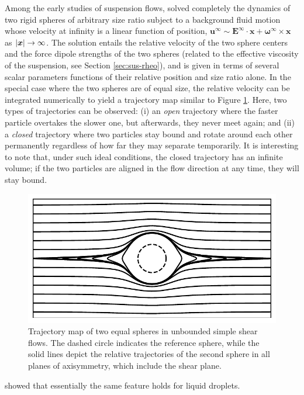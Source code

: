 Among the early studies of suspension flows, \cite{batchelor_green_1972} solved completely the dynamics of two rigid spheres of arbitrary size ratio subject to a background fluid motion whose velocity at infinity is a linear function of position, \ie
${\bm u}^\infty \sim {\bm E}^\infty \cdot {\bm x} + {\bm \omega}^\infty \times {\bm x}$ as $\lvert{\bm x}\rvert \to \infty$.
The solution entails the relative velocity of the two sphere centers and the force dipole strengths of the two spheres (related to the effective viscosity of the suspension, see Section \ref{sec:sus-rheo}), and is given in terms of several scalar parameters functions of their relative position and size ratio alone.
In the special case where the two spheres are of equal size, the relative velocity can be integrated numerically to yield a trajectory map similar to Figure \ref{fig:BG-traj}.
Here, two types of trajectories can be observed:
(i) an \emph{open} trajectory where the faster particle overtakes the slower one, but afterwards, they never meet again; and
(ii) a \emph{closed} trajectory where two particles stay bound and rotate around each other permanently regardless of how far they may separate temporarily.
It is interesting to note that, under such ideal conditions, the closed trajectory has an infinite volume; if the two particles are aligned in the flow direction at any time, they will stay bound.

\begin{figure}%
  \centering
  \includegraphics[width=0.8\columnwidth]{BG-traj4.pdf}
  \caption{Trajectory map of two equal spheres in unbounded simple shear flows. The dashed circle indicates the reference sphere, while the solid lines depict the relative trajectories of the second sphere in all planes of axisymmetry, which include the shear plane.}
  \label{fig:BG-traj}
\end{figure}

\cite{Zinchenko1983,Zinchenko1984} showed that essentially the same feature holds for liquid droplets.

